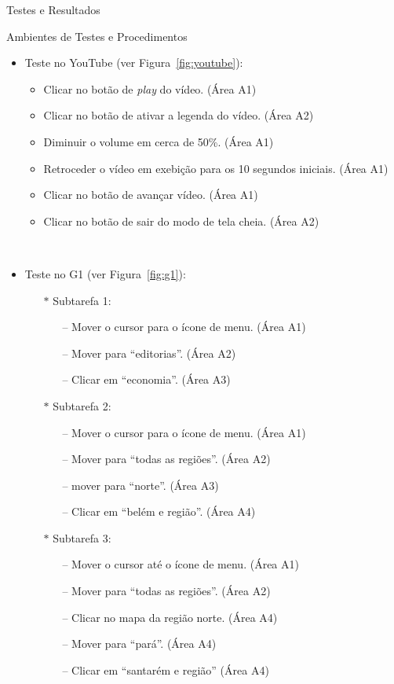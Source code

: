 \begin{chapter}{Testes e Resultados}
\begin{section}{Ambientes de Testes e Procedimentos}
\begin{itemize}
\item Teste no YouTube (ver Figura~\ref{fig:youtube}):
	\begin{itemize}
	\renewcommand\labelitemi{--}
	\item Clicar no botão de \textit{play} do vídeo.                   \hfill(Área A1)
	\item Clicar no botão de ativar a legenda do vídeo.                \hfill(Área A2)
	\item Diminuir o volume em cerca de 50\%.                          \hfill(Área A1)
	\item Retroceder o vídeo em exebição para os 10 segundos iniciais. \hfill(Área A1)
	\item Clicar no botão de avançar vídeo.                            \hfill(Área A1)
	\item Clicar no botão de sair do modo de tela cheia.               \hfill(Área A2)
	\end{itemize}
~
\break
\item Teste no G1 (ver Figura~\ref{fig:g1}):
	\begin{itemize}
	\item[$\ast$] Subtarefa 1:
		\begin{itemize}
		\item[--] Mover o cursor para o ícone de menu.        \hfill (Área A1)
		\item[--] Mover para ``editorias''.                   \hfill (Área A2)
		\item[--] Clicar em ``economia''.                     \hfill (Área A3)
		\end{itemize}
	\item[$\ast$] Subtarefa 2:
		\begin{itemize}
		\item[--] Mover o cursor para o ícone de menu.        \hfill (Área A1)
		\item[--] Mover para ``todas as regiões''.            \hfill (Área A2)
		\item[--] mover para ``norte''.                       \hfill (Área A3)
		\item[--] Clicar em ``belém e região''.               \hfill (Área A4)
		\end{itemize}
	\item[$\ast$] Subtarefa 3:
		\begin{itemize}
		\item[--] Mover o cursor até o ícone de menu.         \hfill(Área A1)
		\item[--] Mover para ``todas as regiões''.            \hfill(Área A2)
		\item[--] Clicar no mapa da região norte.             \hfill(Área A4)
		\item[--] Mover para ``pará''.                        \hfill(Área A4)
		\item[--] Clicar em ``santarém e região''             \hfill(Área A4)
		\end{itemize}
	\end{itemize}
\end{itemize}


\end{section}
\end{chapter}

